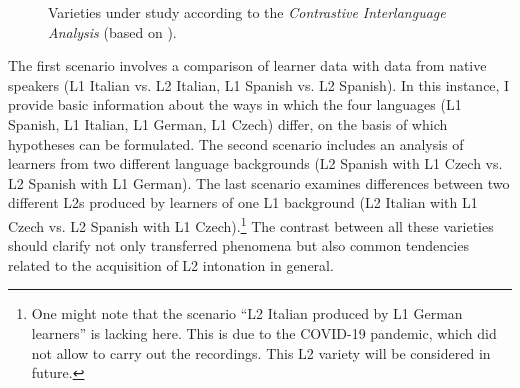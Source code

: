 \begin{figure}
\small
{}
\caption{Varieties under study according to the \textit{Contrastive Interlanguage Analysis} (based on \citealt{Granger1996,Granger2015}).}
\label{fig:1:1}
\end{figure}

The first scenario involves a comparison of learner data with data from native speakers (L1 Italian vs. L2 Italian, L1 Spanish vs. L2 Spanish). In this instance, I provide basic information about the ways in which the four languages (L1 Spanish, L1 Italian, L1 German, L1 Czech) differ, on the basis of which hypotheses can be formulated. The second scenario includes an analysis of learners from two different language backgrounds (L2 Spanish with L1 Czech vs. L2 Spanish with L1 German). The last scenario examines differences between two different L2s produced by learners of one L1 background (L2 Italian with L1 Czech vs. L2 Spanish with L1 Czech).\footnote{One might note that the scenario “L2 Italian produced by L1 German learners” is lacking here. This is due to the COVID-19 pandemic, which did not allow to carry out the recordings. This L2 variety will be considered in future.} The contrast between all these varieties should clarify not only transferred phenomena but also common tendencies related to the acquisition of L2 intonation in general.


